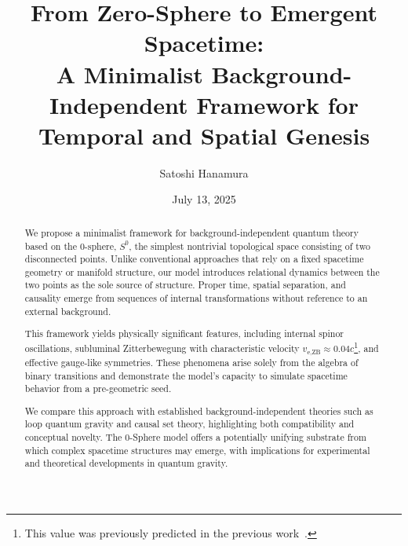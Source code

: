 \documentclass[%
 reprint,
 amsmath,amssymb,
 aps,
]{revtex4-1}
\numberwithin{equation}{section}%
\begin{document}


\title{From Zero-Sphere to Emergent Spacetime:\\ A Minimalist Background-Independent Framework for Temporal and Spatial Genesis}
\author{Satoshi Hanamura}
\date{July 13, 2025}


\begin{abstract}
We propose a minimalist framework for background-independent quantum theory based on the 0-sphere, $S^0$, the simplest nontrivial topological space consisting of two disconnected points. Unlike conventional approaches that rely on a fixed spacetime geometry or manifold structure, our model introduces relational dynamics between the two points as the sole source of structure. Proper time, spatial separation, and causality emerge from sequences of internal transformations without reference to an external background.

This framework yields physically significant features, including internal spinor oscillations, subluminal Zitterbewegung with characteristic velocity $v_{\text{e,ZB}} \approx 0.04c$\footnote{This value was previously predicted in the previous work~\cite{hanamura2501.0130}.}, and effective gauge-like symmetries. These phenomena arise solely from the algebra of binary transitions and demonstrate the model's capacity to simulate spacetime behavior from a pre-geometric seed.

We compare this approach with established background-independent theories such as loop quantum gravity and causal set theory, highlighting both compatibility and conceptual novelty. The 0-Sphere model offers a potentially unifying substrate from which complex spacetime structures may emerge, with implications for experimental and theoretical developments in quantum gravity.
\end{abstract}


\maketitle

\end{document}
